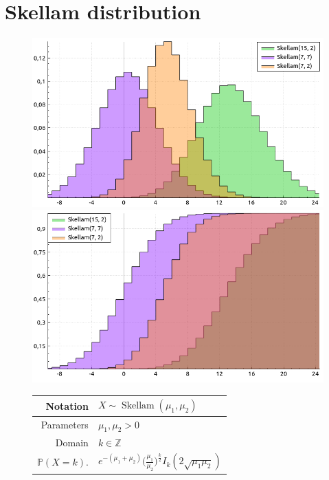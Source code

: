 \documentclass[a4paper,11pt]{article}
\theoremstyle{plain}
\theoremstyle{definition}
\newcommand{\MP}{\mathbb{P}}
\newcommand{\MZ}{\mathbb{Z}}
\begin{document}
	
	\pagebreak
	\section{Skellam distribution}
	
	\begin{figure}[!htb]\centering
		\begin{minipage}{0.55\textwidth}
			\includegraphics[width=\linewidth, right]{skellam_pmf}
			\captionsetup{labelformat=empty}
			\includegraphics[width=\linewidth, right]{skellam_cdf}
			\captionsetup{labelformat=empty}
		\end{minipage}
		\begin{minipage}{0.4\textwidth}
			\begin{tabular}{| r | l |}
				\hline
				Notation & $ X \sim \operatorname{Skellam}(\mu_1, \mu_2) $ \\
				\hline
				Parameters & $\mu_1, \mu_2 > 0$ \\
				\hline
				Domain & $ k \in \MZ $  \\
				\hline
				$\MP(X = k)$. & $e^{-(\mu_1 + \mu_2)} \Big( \frac{\mu_1}{\mu_2} \Big)^{\frac{k}{2}} I_k(2\sqrt{\mu_1\mu_2}) $ \\

\end{tabular}
\end{minipage}
\end{figure}
\end{document}
